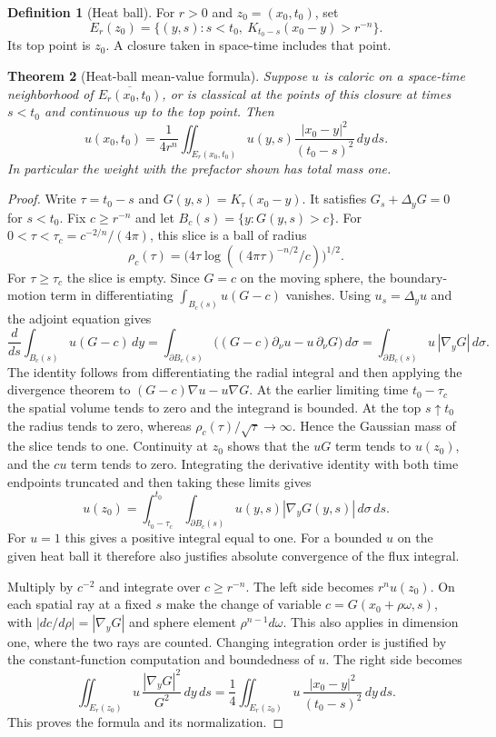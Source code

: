 \documentclass[11pt,oneside,openany]{book}
\theoremstyle{plain}
\newtheorem{theorem}{Theorem}[chapter]
\theoremstyle{definition}
\newtheorem{definition}[theorem]{Definition}
\theoremstyle{remark}
\begin{document}
\begin{definition}[Heat ball]
For \(r>0\) and \(z_0=(x_0,t_0)\), set
\[
 E_r(z_0)=\{(y,s):s<t_0,\ K_{t_0-s}(x_0-y)>r^{-n}\}.
\]
Its top point is \(z_0\). A closure taken in space-time
includes that point.
\end{definition}

\begin{theorem}[Heat-ball mean-value formula]
\label{pde:heat-ball}
Suppose \(u\) is caloric on a space-time neighborhood of
\(\overline{E_r(x_0,t_0)}\), or is classical at the points of
this closure at times \(s<t_0\) and continuous up to the top point.
Then
\[
 u(x_0,t_0)=\frac{1}{4r^n}\iint_{E_r(x_0,t_0)}
       u(y,s)\frac{|x_0-y|^2}{(t_0-s)^2}\,dy\,ds .
\]
In particular the weight with the prefactor shown has total mass one.
\end{theorem}

\begin{proof}
Write \(\tau=t_0-s\) and \(G(y,s)=K_\tau(x_0-y)\).
It satisfies \(G_s+\Delta_y G=0\) for \(s<t_0\).
Fix \(c\geq r^{-n}\) and let \(B_c(s)=\{y:G(y,s)>c\}\).
For \(0<\tau<\tau_c=c^{-2/n}/(4\pi)\), this slice is a ball
of radius
\[
 \rho_c(\tau)=\bigl(4\tau\log((4\pi\tau)^{-n/2}/c)\bigr)^{1/2}.
\]
For \(\tau\geq\tau_c\) the slice is empty.
Since \(G=c\) on the moving sphere, the boundary-motion term in
differentiating \(\int_{B_c(s)}u(G-c)\) vanishes.
Using \(u_s=\Delta_y u\) and the adjoint equation gives
\[
 \frac{d}{ds}\int_{B_c(s)}u(G-c)\,dy
 =\int_{\partial B_c(s)}
       \bigl((G-c)\partial_\nu u-u\,\partial_\nu G\bigr)\,d\sigma
 =\int_{\partial B_c(s)}u\,|\nabla_y G|\,d\sigma .
\]
The identity follows from differentiating the radial integral and
then applying the divergence theorem to
\((G-c)\nabla u-u\nabla G\).
At the earlier limiting time \(t_0-\tau_c\) the spatial volume
tends to zero and the integrand is bounded.
At the top \(s\uparrow t_0\) the radius tends to zero, whereas
\(\rho_c(\tau)/\sqrt\tau\to\infty\). Hence the Gaussian mass of
the slice tends to one. Continuity at \(z_0\) shows that the
\(uG\) term tends to \(u(z_0)\), and the \(cu\) term tends to zero.
Integrating the derivative identity with both time endpoints
truncated and then taking these limits gives
\[
 u(z_0)=\int_{t_0-\tau_c}^{t_0}
           \int_{\partial B_c(s)}u(y,s)|\nabla_y G(y,s)|\,d\sigma\,ds .
\]
For \(u=1\) this gives a positive integral equal to one.
For a bounded \(u\) on the given heat ball it therefore also
justifies absolute convergence of the flux integral.

Multiply by \(c^{-2}\) and integrate over \(c\geq r^{-n}\).
The left side becomes \(r^n u(z_0)\).
On each spatial ray at a fixed \(s\) make the change of variable
\(c=G(x_0+\rho\omega,s)\), with
\(|dc/d\rho|=|\nabla_y G|\) and sphere element
\(\rho^{n-1}d\omega\). This also applies in dimension one, where
the two rays are counted. Changing integration order is justified
by the constant-function computation and boundedness of \(u\).
The right side becomes
\[
  \iint_{E_r(z_0)}u\,\frac{|\nabla_y G|^2}{G^2}\,dy\,ds
   =\frac14\iint_{E_r(z_0)}u\,\frac{|x_0-y|^2}{(t_0-s)^2}\,dy\,ds .
\]
This proves the formula and its normalization.
\end{proof}
\end{document}
